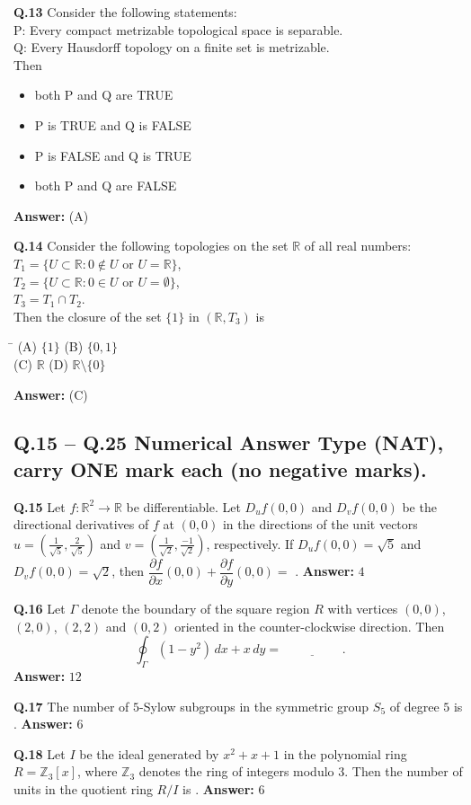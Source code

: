\documentclass[11pt,a4paper]{article}
\newcommand{\optsfourA}[4]{%
  \begin{tabbing}
    \hspace{0.48\linewidth}\=\kill
    (A) #1 \> (B) #2 \\[2pt]
    (C) #3 \> (D) #4
  \end{tabbing}%
}
\newcommand{\optslistA}[4]{%
  \begin{itemize}
    \setlength{\itemsep}{2pt}\setlength{\parskip}{0pt}
    \item[(A)] #1
    \item[(B)] #2
    \item[(C)] #3
    \item[(D)] #4
  \end{itemize}%
}
\newcommand{\ans}[1]{\textbf{Answer:} #1\par\medskip}
\begin{document}
\textbf{Q.13} Consider the following statements:\\
P: Every compact metrizable topological space is separable.\\
Q: Every Hausdorff topology on a finite set is metrizable.\\
Then
\optslistA{both P and Q are TRUE}{P is TRUE and Q is FALSE}{P is FALSE and Q is TRUE}{both P and Q are FALSE}
\ans{(A)}

\textbf{Q.14} Consider the following topologies on the set $\mathbb{R}$ of all real numbers:\\
$T_1 = \{U \subset \mathbb{R} : 0 \notin U \text{ or } U = \mathbb{R}\}$,\\
$T_2 = \{U \subset \mathbb{R} : 0 \in U \text{ or } U = \emptyset\}$,\\
$T_3 = T_1 \cap T_2$.\\
Then the closure of the set $\{1\}$ in $(\mathbb{R}, T_3)$ is
\optsfourA{$\{1\}$}{$\{0, 1\}$}{$\mathbb{R}$}{$\mathbb{R} \setminus \{0\}$}
\ans{(C)}

\subsection*{Q.15 -- Q.25 Numerical Answer Type (NAT), carry ONE mark each (no negative marks).}

\textbf{Q.15} Let $f : \mathbb{R}^2 \to \mathbb{R}$ be differentiable. Let $D_u f(0, 0)$ and $D_v f(0, 0)$ be the directional derivatives of $f$ at $(0, 0)$ in the directions of the unit vectors $u = \left(\frac{1}{\sqrt{5}}, \frac{2}{\sqrt{5}}\right)$ and $v = \left(\frac{1}{\sqrt{2}}, \frac{-1}{\sqrt{2}}\right)$, respectively. If $D_u f(0, 0) = \sqrt{5}$ and $D_v f(0, 0) = \sqrt{2}$, then $\dfrac{\partial f}{\partial x}(0, 0) + \dfrac{\partial f}{\partial y}(0, 0) =$ \underline{\hspace{2cm}}.
\ans{$4$}

\textbf{Q.16} Let $\Gamma$ denote the boundary of the square region $R$ with vertices $(0, 0)$, $(2, 0)$, $(2, 2)$ and $(0, 2)$ oriented in the counter-clockwise direction. Then
\[
  \oint_\Gamma (1 - y^2)\,dx + x\,dy = \underline{\hspace{2cm}}.
\]
\ans{$12$}

\textbf{Q.17} The number of $5$-Sylow subgroups in the symmetric group $S_5$ of degree $5$ is \underline{\hspace{2cm}}.
\ans{$6$}

\textbf{Q.18} Let $I$ be the ideal generated by $x^2 + x + 1$ in the polynomial ring $R = \mathbb{Z}_3[x]$, where $\mathbb{Z}_3$ denotes the ring of integers modulo $3$. Then the number of units in the quotient ring $R / I$ is \underline{\hspace{2cm}}.
\ans{$6$}
\end{document}
